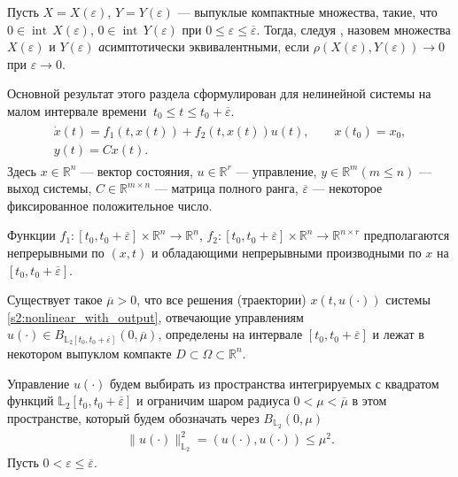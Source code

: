 \documentclass[../abstract.tex]{subfiles}
\begin{document}
Пусть $ X = X(\varepsilon) $, $ Y = Y(\varepsilon) $ --- выпуклые компактные множества, такие, что $ 0 \in \operatorname{int}\,X(\varepsilon) $, $ 0 \in \operatorname{int}\,Y(\varepsilon) $ при $0 \leqslant \varepsilon \leqslant \overline{\varepsilon} $.
Тогда, следуя \cite{Ovs}, назовем множества $ X(\varepsilon) $ и $ Y(\varepsilon) $ {\textit асимптотически эквивалентными}, если $ \rho (X(\varepsilon), Y(\varepsilon)) \rightarrow 0 $ при $\varepsilon \rightarrow 0 $.

Основной результат этого раздела сформулирован для нелинейной системы на малом интервале времени $\ t_0 \leqslant t \leqslant t_0 + \overline{\varepsilon} $.
\begin{gather}\label{s2:nonlinear_with_output}
	\begin{gathered}
		\dot{x}(t)=f_1(t,x(t))+f_2(t,x(t))u(t), \qquad x(t_0) = x_0, \\
		y(t) = C x(t).
	\end{gathered}
\end{gather}
Здесь $ x \in \mathbb{R}^n $ --- вектор состояния, $ u \in \mathbb{R}^r $ --- управление, $ y\in\mathbb{R}^m (m \leqslant n) $ --- выход системы,
$ C\in \mathbb{R}^{m \times n} $ --- матрица полного ранга, $ \overline{\varepsilon} $ --- некоторое фиксированное положительное число.

Функции $ f_1: [t_0, t_0 + \overline{\varepsilon}] \times \mathbb{R}^{n} \rightarrow \mathbb{R}^{n} $, $ f_2: [t_0, t_0 + \overline{\varepsilon}] \times \mathbb{R}^{n} \rightarrow \mathbb{R}^{n \times r} $ предполагаются непрерывными по $(x, t)$ и обладающими непрерывными производными по $x$ на $ [t_0, t_0 + \overline{\varepsilon}]$.

\begin{assumption}\label{s1:as:right_hand_side_conditions_global}
	Существует такое $\overline{\mu} > 0 $, что все решения (траектории) $ x(t, u(\cdot)) $ системы \eqref{s2:nonlinear_with_output}, отвечающие управлениям $u(\cdot) \in B_{\mathbb{L}_2[t_0, t_0 + \overline{\varepsilon}]}(0,\overline{\mu})$, определены на интервале $ [t_0,t_0 + \overline{\varepsilon}] $ и лежат в некотором выпуклом компакте $D \subset \Omega \subset \mathbb{R}^n$. 
\end{assumption}

Управление $u(\cdot)$ будем выбирать из пространства интегрируемых с квадратом функций $\mathbb{L}_2[t_0,t_0+\overline{\varepsilon}]$ и ограничим шаром радиуса $ 0 < \mu < \overline{\mu} $ в этом пространстве, который будем обозначать через $B_{\mathbb{L}_2}(0, \mu)$
\begin{gather*}
	\lVert u(\cdot)\rVert^2_{\mathbb{L}_2} = \left(u(\cdot),u(\cdot) \right) \leqslant \mu^2.
\end{gather*}
Пусть $ 0 < \varepsilon \leqslant \overline{\varepsilon} $. 
\end{document}
